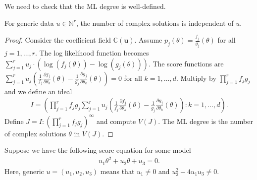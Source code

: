 We need to check that the ML degree is well-defined.

\begin{prop}
  For generic data \( u \in \mathbb N^r  \), the number of complex solutions is independent of \( u \).
\end{prop}

\begin{proof}
  Consider the coefficient field \( \mathbb C(\mathbf u) \). Assume \( p_j(\theta) = \frac{f_j}{g_j}(\theta) \) for all \( j= 1, \dots, r \). The log likelihood function becomes \( \sum^r_{j=1}u_j \cdot (\log(f_j(\theta)) - \log(g_j(\theta))) \). The score functions are \( \sum_{j=1}^r u_j (\frac{1}{f_j} \frac{\partial f_j}{\partial \theta_k}(\theta) - \frac{1}{g_j} \frac{\partial g_j}{\partial \theta_k}(\theta)) = 0 \) for all \( k=1, \dots, d \). Multiply by \( \prod_{j=1}^r f_j g_j \) and we define an ideal 
  \begin{align*}
    I = \left( \prod_{j=1}^r f_jg_j \sum_{j=1}^r u_j \left(\frac{1}{f_j} \frac{\partial f_j}{\partial \theta_k}(\theta) - \frac{1}{g_j} \frac{\partial g_j}{\partial \theta_k}(\theta)\right) : k = 1, \dots, d \right).
  \end{align*}
  Define \( J = I : \left(\prod_{j=1}^r f_jg_j\right)^\infty \) and compute \( V(J) \). The ML degree is the number of complex solutions \( \theta \) in \( V(J) \).
\end{proof}

\begin{eg}
  Suppose we have the following score equation for some model
  \begin{align*}
    u_1 \theta^2 + u_2 \theta  + u_3 = 0.
  \end{align*}
  Here, generic \( u = (u_1,u_2,u_3) \) means that \( u_1 \neq 0 \) and \( u_2^2 - 4u_1u_3 \neq 0 \).
\end{eg}

